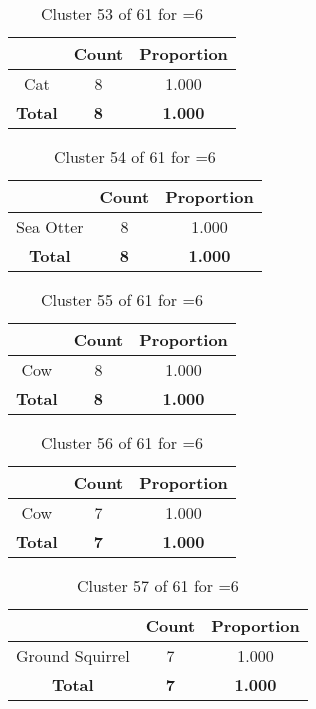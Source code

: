 \begin{table}[ht!]
\centering
\begin{tabular}{|c|c|c|}
\hline
\bf \Spec{} &\bf Count &\bf Proportion\\ \hline \hline
Cat & 8 & 1.000\\ \hline
\hline
\bf Total & \bf 8 & \bf 1.000\\ \hline
\end{tabular}
\label{tab:cluster:53:6}
\caption{Cluster 53 of 61 for \minneigh{}=6}
\end{table}

\begin{table}[ht!]
\centering
\begin{tabular}{|c|c|c|}
\hline
\bf \Spec{} &\bf Count &\bf Proportion\\ \hline \hline
Sea Otter & 8 & 1.000\\ \hline
\hline
\bf Total & \bf 8 & \bf 1.000\\ \hline
\end{tabular}
\label{tab:cluster:54:6}
\caption{Cluster 54 of 61 for \minneigh{}=6}
\end{table}

\begin{table}[ht!]
\centering
\begin{tabular}{|c|c|c|}
\hline
\bf \Spec{} &\bf Count &\bf Proportion\\ \hline \hline
Cow & 8 & 1.000\\ \hline
\hline
\bf Total & \bf 8 & \bf 1.000\\ \hline
\end{tabular}
\label{tab:cluster:55:6}
\caption{Cluster 55 of 61 for \minneigh{}=6}
\end{table}

\begin{table}[ht!]
\centering
\begin{tabular}{|c|c|c|}
\hline
\bf \Spec{} &\bf Count &\bf Proportion\\ \hline \hline
Cow & 7 & 1.000\\ \hline
\hline
\bf Total & \bf 7 & \bf 1.000\\ \hline
\end{tabular}
\label{tab:cluster:56:6}
\caption{Cluster 56 of 61 for \minneigh{}=6}
\end{table}

\begin{table}[ht!]
\centering
\begin{tabular}{|c|c|c|}
\hline
\bf \Spec{} &\bf Count &\bf Proportion\\ \hline \hline
Ground Squirrel & 7 & 1.000\\ \hline
\hline
\bf Total & \bf 7 & \bf 1.000\\ \hline
\end{tabular}
\label{tab:cluster:57:6}
\caption{Cluster 57 of 61 for \minneigh{}=6}
\end{table}

